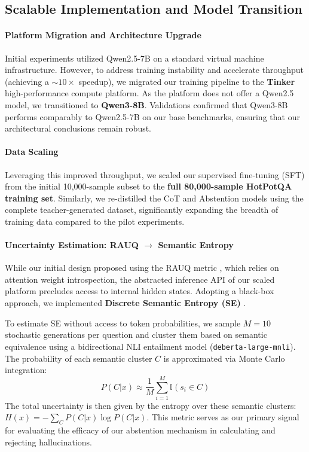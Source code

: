 \documentclass{article}
\begin{document}
\subsection{Scalable Implementation and Model Transition}

\paragraph{Platform Migration and Architecture Upgrade}
Initial experiments utilized Qwen2.5-7B on a standard virtual machine infrastructure. However, to address training instability and accelerate throughput (achieving a $\sim10\times$ speedup), we migrated our training pipeline to the \textbf{Tinker} high-performance compute platform. As the platform does not offer a Qwen2.5 model, we transitioned to \textbf{Qwen3-8B}. Validations confirmed that Qwen3-8B performs comparably to Qwen2.5-7B on our base benchmarks, ensuring that our architectural conclusions remain robust.

\paragraph{Data Scaling}
Leveraging this improved throughput, we scaled our supervised fine-tuning (SFT) from the initial 10,000-sample subset to the \textbf{full 80,000-sample HotPotQA training set}. Similarly, we re-distilled the CoT and Abstention models using the complete teacher-generated dataset, significantly expanding the breadth of training data compared to the pilot experiments.

\paragraph{Uncertainty Estimation: RAUQ $\to$ Semantic Entropy}
While our initial design proposed using the RAUQ metric \cite{vazhentsev2025rauq}, which relies on attention weight introspection, the abstracted inference API of our scaled platform precludes access to internal hidden states. Adopting a black-box approach, we implemented \textbf{Discrete Semantic Entropy (SE)} \cite{kuhn2023semantic}.

To estimate SE without access to token probabilities, we sample $M=10$ stochastic generations per question and cluster them based on semantic equivalence using a bidirectional NLI entailment model (\texttt{deberta-large-mnli}). The probability of each semantic cluster $C$ is approximated via Monte Carlo integration:
\begin{equation}
P(C|x) \approx \frac{1}{M} \sum_{i=1}^M \mathbb{I}(s_i \in C)
\end{equation}
The total uncertainty is then given by the entropy over these semantic clusters: $H(x) = -\sum_{C} P(C|x) \log P(C|x)$. This metric serves as our primary signal for evaluating the efficacy of our abstention mechanism in calculating and rejecting hallucinations.
\end{document}
